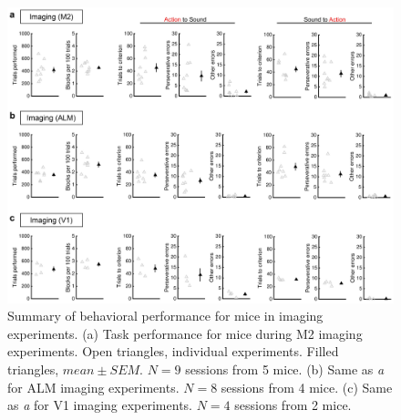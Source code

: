 \begin{figure}[htbp]

\begin{center}
\includegraphics[width=\textwidth]{Figures/Chapter3/NN_figS1} 
\end{center}

\caption[Summary of behavioral performance for mice in imaging experiments]
{Summary of behavioral performance for mice in imaging experiments. (a) Task performance for mice during M2 imaging experiments. Open triangles, individual experiments. Filled triangles, $mean\pm\mathit{SEM}$. $N = 9$ sessions from 5 mice. (b) Same as \emph{a} for ALM imaging experiments. $N = 8$ sessions from 4 mice. (c) Same as \emph{a} for V1 imaging experiments. $N = 4$ sessions from 2 mice.}

\label{fig:NN_figS1}
\end{figure}